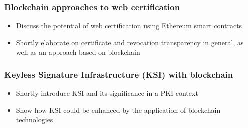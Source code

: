 \subsubsection{Blockchain approaches to web certification}

\begin{itemize}
  \item Discuss the potential of web certification using Ethereum smart contracts \cite{Moosavi1993}
  \item Shortly elaborate on certificate and revocation transparency in general, as well as an approach based on blockchain \cite{Wang2018}
\end{itemize}

\subsubsection{Keyless Signature Infrastructure (KSI) with blockchain}

\begin{itemize}
  \item Shortly introduce KSI and its significance in a PKI context \cite{Buldas2013}
  \item Show how KSI could be enhanced by the application of blockchain technologies \cite{Jamthagen2017}
\end{itemize}
